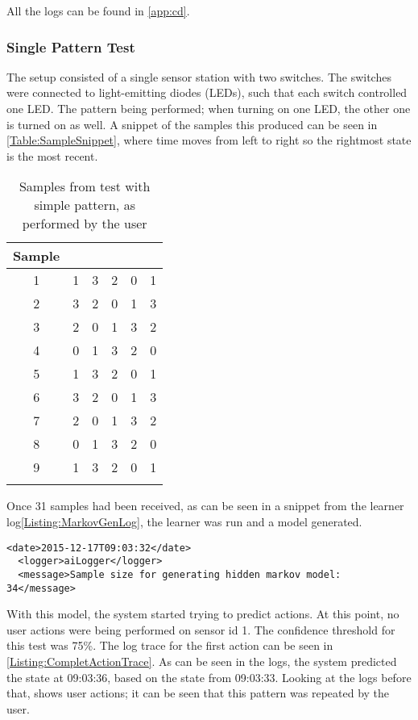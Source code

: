 All the logs can be found in \cref{app:cd}. 
\subsubsection{Single Pattern Test}
The setup consisted of a single sensor station with two switches. The switches were connected to light-emitting diodes (LEDs), such that each switch controlled one LED. The pattern being performed; when turning on one LED, the other one is turned on as well. A snippet of the samples this produced can be seen in \cref{Table:SampleSnippet}, where time moves from left to right so the rightmost state is the most recent.
\begin{center}

\begin{table}[htbp]
  \centering
  \begin{tabular}{c c c c c c}
    \toprule
    Sample & & & & &  \\ \midrule
    1 & 1 & 3 & 2 & 0 & 1 \\
    2 & 3 & 2 & 0 & 1 & 3 \\
    3 & 2 & 0 & 1 & 3 & 2 \\
    4 & 0 & 1 & 3 & 2 & 0 \\
    5 & 1 & 3 & 2 & 0 & 1 \\
    6 & 3 & 2 & 0 & 1 & 3 \\
    7 & 2 & 0 & 1 & 3 & 2 \\
    8 & 0 & 1 & 3 & 2 & 0 \\
    9 & 1 & 3 & 2 & 0 & 1 \\
     \\ \bottomrule
  \end{tabular}
  \caption{Samples from test with simple pattern, as performed by the user}
\end{table}

\label{Table:SampleSnippet}
\end{center}
Once 31 samples had been received, as can be seen in a snippet from the learner log\cref{Listing:MarkovGenLog}, the learner was run and a model generated.
\lstset{language=xml}
\begin{lstlisting}[label = Listing:MarkovGenLog, caption = Snippet of log from model generation]
  <date>2015-12-17T09:03:32</date>
  <logger>aiLogger</logger>
  <message>Sample size for generating hidden markov model: 34</message>
\end{lstlisting}
With this model, the system started trying to predict actions. At this point, no user actions were being performed on sensor id 1. The confidence threshold for this test was 75\%. The log trace for the first action can be seen in \cref{Listing:CompletActionTrace}. As can be seen in the logs, the system predicted the state at 09:03:36, based on the state from 09:03:33. Looking at the logs before that, shows user actions; it can be seen that this pattern was repeated by the user.
